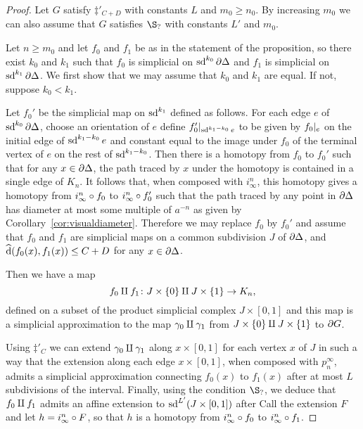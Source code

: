 \documentclass[a4paper]{article}
\begin{document}
\begin{proof}
  Let $G$ satisfy $\ddag'_{C+D}$ with constants $L$ and $m_0 \geq n_0$.
  By increasing $m_0$ we can also assume that $G$ satisfies $\S_?$ with
  constants $L'$ and $m_0$.

  Let $n \geq m_0$ and let $f_0$ and $f_1$ be as in the statement of the
  proposition, so there exist $k_0$ and $k_1$ such that $f_0$ is simplicial on
  $\operatorname{sd}^{k_0}\partial\Delta$ and $f_1$ is simplicial on
  $\operatorname{sd}^{k_1}\partial\Delta$. We first show that we may assume that $k_0$ and
  $k_1$ are equal. If not, suppose $k_0 < k_1$.

  Let $f_0'$ be the simplicial map on $\operatorname{sd}^{k_1}$ defined as follows. For each
  edge $e$ of $\operatorname{sd}^{k_0}\partial\Delta$, choose an orientation of $e$ define
  $f_0'\vert_{\operatorname{sd}^{k_1-k_0}e}$ to be given by $f_0\vert_{e}$ on the
  initial edge of $\operatorname{sd}^{k_1-k_0}e$ and constant equal to the image under $f_0$
  of the terminal vertex of $e$ on the rest of $\operatorname{sd}^{k_1-k_0}$. Then there is a
  homotopy from $f_0$ to $f_0'$ such that for any $x \in \partial\Delta$, the
  path traced by $x$ under the homotopy is contained in a single edge of $K_n$.
  It follows that, when composed with $i^n_\infty$, this homotopy gives a
  homotopy from $i^n_\infty\circ f_0$ to $i^n_\infty \circ f_0'$ such
  that the path traced by any point in $\partial\Delta$ has diameter at most
  some multiple of $a^{-n}$ as given by Corollary~\ref{cor:visualdiameter}.
  Therefore we may replace $f_0$ by $f_0'$ and assume that $f_0$ and $f_1$ are
  simplicial maps on a common subdivision $J$ of $\partial\Delta$, and
  $\operatorname{\widehat{d}}(f_0(x), f_1(x))\leq C+D$ for any $x \in \partial\Delta$.
  
  Then we have a map 
  \begin{equation*}
    f_0 \amalg f_1 \colon J \times \{0\} \amalg J \times \{1\}
          \to K_n,
  \end{equation*}
  defined on a subset of the product simplicial complex $J \times [0,1]$ and
  this map is a simplicial approximation to the map $\gamma_0 \amalg
  \gamma_1$ from $J\times\{0\} \amalg J \times\{1\}$ to $\partial G$. 
  
  Using $\ddag'_C$ we can extend $\gamma_0\amalg\gamma_1$ along $x
  \times [0,1]$ for each vertex $x$ of $J$ in such a way that the extension
  along each edge $x\times [0,1]$, when composed with $p^\infty_n$, admits a
  simplicial approximation connecting $f_0(x)$ to $f_1(x)$ after at most $L$
  subdivisions of the interval. Finally, using the condition $\S_?$, we deduce
  that $f_0 \amalg f_1$ admits an affine extension to $\operatorname{sd}^{L'}(J
  \times [0,1])$ after Call the extension $F$ and let $h = i^n_\infty \circ
  F$, so that $h$ is a homotopy from $i^n_\infty\circ f_0$ to
  $i^n_\infty\circ f_1$. 
  

\end{proof}
\end{document}
